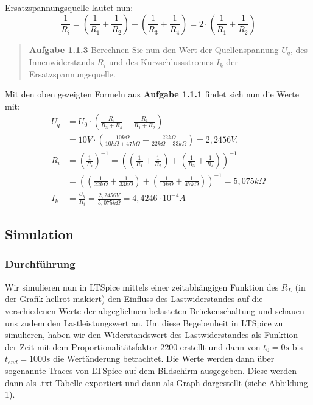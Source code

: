 \documentclass{scrarticle}
\begin{document}
Ersatzspannungsquelle lautet nun:
\begin{equation*}
  \frac{1}{R_i} = \left(\frac{1}{R_1} + \frac{1}{R_2}\right) + \left(\frac{1}{R_3} + \frac{1}{R_4}\right) = 2\cdot\left(\frac{1}{R_1} + \frac{1}{R_2}\right)
\end{equation*}
\begin{abstract}
  \textbf{Aufgabe 1.1.3} Berechnen Sie nun den Wert der Quellenspannung $U_q$, des Innenwiderstands $R_i$ und des Kurzschlussstromes $I_k$ der Ersatzspannungsquelle.
\end{abstract}
Mit den oben gezeigten Formeln aus \textbf{Aufgabe 1.1.1} findet sich nun die Werte mit:
\begin{equation*}
  \begin{aligned}
    U_q &= U_0 \cdot \left(\frac{R_3}{R_3+R_4} - \frac{R_1}{R_1+R_2}\right) \\
        &= 10V \cdot \left(\frac{10k\Omega}{10k\Omega+47k\Omega} - \frac{22k\Omega}{22k\Omega+33k\Omega}\right) = 2,2456V.\\
    R_i &= \left(\frac{1}{R_i}\right)^{-1} = \left(\left(\frac{1}{R_1} + \frac{1}{R_2}\right) + \left(\frac{1}{R_3} + \frac{1}{R_4}\right)\right)^{-1} \\
        &= \left(\left(\frac{1}{22k\Omega} + \frac{1}{33k\Omega}\right) + \left(\frac{1}{10k\Omega} + \frac{1}{47k\Omega}\right)\right)^{-1} = 5,075k\Omega\\
    I_k &= \frac{U_q}{R_i} = \frac{2,2456V}{5,075k\Omega} = 4,4246\cdot 10^{-4}A
  \end{aligned}
\end{equation*}
\newpage

\subsection{Simulation}


\subsubsection{Durchführung}
Wir simulieren nun in LTSpice mittels einer zeitabhängigen Funktion des $R_L$ (in der Grafik hellrot makiert) den Einfluss des Lastwiderstandes
auf die verschiedenen Werte der abgeglichnen belasteten Brückenschaltung und schauen uns zudem den Lastleistungswert an. 
Um diese Begebenheit in LTSpice zu simulieren, haben wir den Widerstandswert des Lastwiderstandes als Funktion der Zeit mit dem 
Proportionalitätsfaktor $2200$ erstellt und dann von $t_0 = 0s$ bis $t_{end} = 1000s$ die Wertänderung betrachtet. Die Werte werden dann über
sogenannte Traces von LTSpice auf dem Bildschirm ausgegeben. Diese werden dann als .txt-Tabelle exportiert und dann als Graph dargestellt (siehe Abbildung 1).
\end{document}
